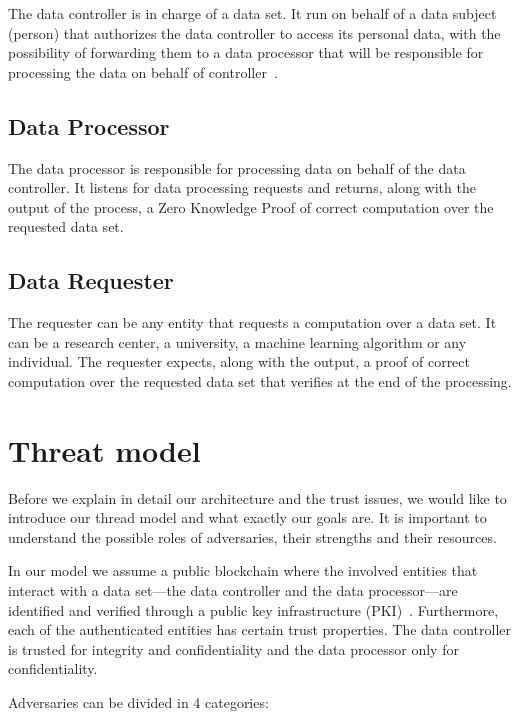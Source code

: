 The data controller is in charge of a data set. It run on behalf of a data subject (person)
that authorizes the data controller to access its personal data, with the possibility of forwarding
them to a data processor that will be responsible for processing the data on behalf of controller~\cite{DBLP:journals/corr/NeisseSF17}.

\subsection{Data Processor}
\label{solution:entities:data_processor}

The data processor is responsible for processing data on behalf of the data controller. It listens for data processing requests and returns, along with the output of the process, a Zero Knowledge Proof of correct computation over the requested data set.

\subsection{Data Requester}
\label{solution:entities:data_req}

The requester can be any entity that requests a computation over a data set. It can be a research center, a university, a machine learning algorithm or any individual. The requester expects, along with the output, a proof of correct computation over the requested data set that verifies at the end of the processing.

\section{Threat model}
\label{solution:treat_model}

Before we explain in detail our architecture and the trust issues, we would like to introduce our thread model and what exactly our goals are. It is important to understand the possible roles of adversaries, their strengths and their resources.

In our model we assume a public blockchain where the involved entities that interact with a data set---the data controller and the data processor---are identified and verified through a public key infrastructure (PKI)~\cite{adams_understanding_2003}. Furthermore, each of the authenticated entities has certain trust properties. Τhe data controller is trusted for integrity and confidentiality and the data processor only for confidentiality.

Adversaries can be divided in 4 categories:

